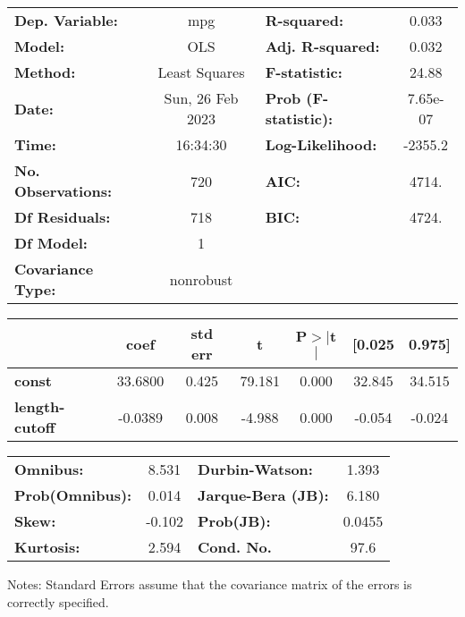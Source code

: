 \begin{center}
\begin{tabular}{lclc}
\toprule
\textbf{Dep. Variable:}    &       mpg        & \textbf{  R-squared:         } &     0.033   \\
\textbf{Model:}            &       OLS        & \textbf{  Adj. R-squared:    } &     0.032   \\
\textbf{Method:}           &  Least Squares   & \textbf{  F-statistic:       } &     24.88   \\
\textbf{Date:}             & Sun, 26 Feb 2023 & \textbf{  Prob (F-statistic):} &  7.65e-07   \\
\textbf{Time:}             &     16:34:30     & \textbf{  Log-Likelihood:    } &   -2355.2   \\
\textbf{No. Observations:} &         720      & \textbf{  AIC:               } &     4714.   \\
\textbf{Df Residuals:}     &         718      & \textbf{  BIC:               } &     4724.   \\
\textbf{Df Model:}         &           1      & \textbf{                     } &             \\
\textbf{Covariance Type:}  &    nonrobust     & \textbf{                     } &             \\
\bottomrule
\end{tabular}
\begin{tabular}{lcccccc}
                       & \textbf{coef} & \textbf{std err} & \textbf{t} & \textbf{P$> |$t$|$} & \textbf{[0.025} & \textbf{0.975]}  \\
\midrule
\textbf{const}         &      33.6800  &        0.425     &    79.181  &         0.000        &       32.845    &       34.515     \\
\textbf{length-cutoff} &      -0.0389  &        0.008     &    -4.988  &         0.000        &       -0.054    &       -0.024     \\
\bottomrule
\end{tabular}
\begin{tabular}{lclc}
\textbf{Omnibus:}       &  8.531 & \textbf{  Durbin-Watson:     } &    1.393  \\
\textbf{Prob(Omnibus):} &  0.014 & \textbf{  Jarque-Bera (JB):  } &    6.180  \\
\textbf{Skew:}          & -0.102 & \textbf{  Prob(JB):          } &   0.0455  \\
\textbf{Kurtosis:}      &  2.594 & \textbf{  Cond. No.          } &     97.6  \\
\bottomrule
\end{tabular}
\end{center}

Notes: \newline
 [1] Standard Errors assume that the covariance matrix of the errors is correctly specified.